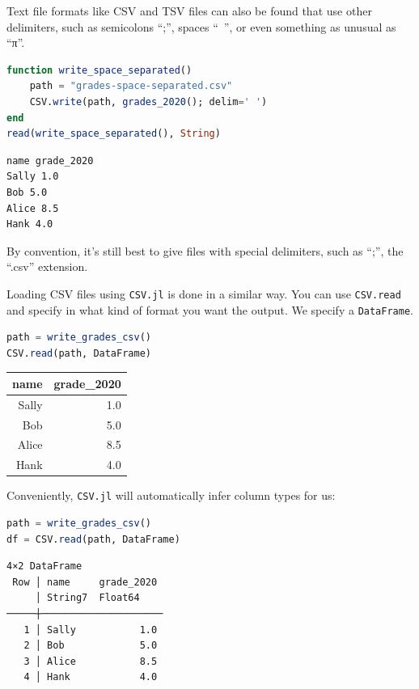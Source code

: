 \documentclass[
  notoc %
]{tufte-book}
\newcommand{\passthrough}[1]{#1}
\begin{document}
Text file formats like CSV and TSV files can also be found that use
other delimiters, such as semicolons ``;'', spaces ``~'', or even
something as unusual as ``π''.

\begin{lstlisting}[language=Julia]
function write_space_separated()
    path = "grades-space-separated.csv"
    CSV.write(path, grades_2020(); delim=' ')
end
read(write_space_separated(), String)
\end{lstlisting}

\begin{lstlisting}[language=Output]
name grade_2020
Sally 1.0
Bob 5.0
Alice 8.5
Hank 4.0

\end{lstlisting}

By convention, it's still best to give files with special delimiters,
such as ``;'', the ``.csv'' extension.

Loading CSV files using \passthrough{\lstinline!CSV.jl!} is done in a
similar way. You can use \passthrough{\lstinline!CSV.read!} and specify
in what kind of format you want the output. We specify a
\passthrough{\lstinline!DataFrame!}.

\begin{lstlisting}[language=Julia]
path = write_grades_csv()
CSV.read(path, DataFrame)
\end{lstlisting}

\begin{longtable}[]{@{}rr@{}}
\toprule()
name & grade\_2020 \\
\midrule()
\endhead
Sally & 1.0 \\
Bob & 5.0 \\
Alice & 8.5 \\
Hank & 4.0 \\
\bottomrule()
\end{longtable}

Conveniently, \passthrough{\lstinline!CSV.jl!} will automatically infer
column types for us:

\begin{lstlisting}[language=Julia]
path = write_grades_csv()
df = CSV.read(path, DataFrame)
\end{lstlisting}

\begin{lstlisting}[language=Output]
4×2 DataFrame
 Row │ name     grade_2020
     │ String7  Float64
─────┼─────────────────────
   1 │ Sally           1.0
   2 │ Bob             5.0
   3 │ Alice           8.5
   4 │ Hank            4.0
\end{lstlisting}
\end{document}
